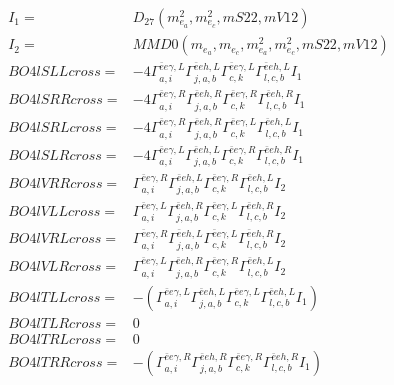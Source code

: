 \documentclass[A4,landscape]{article}
\begin{document}
\begin{align} 
I_1 = & D_{27}(m^2_{e_{{a}}}, m^2_{e_{{c}}}, mS22, mV12) \\ 
I_2 = & MMD0(m_{e_{{a}}}, m_{e_{{c}}}, m^2_{e_{{a}}}, m^2_{e_{{c}}}, mS22, mV12) \\ 
  BO4lSLLcross= & -4  \Gamma^{\bar{e}e \gamma ,L}_{a, i} \Gamma^{\bar{e}e h ,L}_{j, a, b} \Gamma^{\bar{e}e \gamma ,L}_{c, k} \Gamma^{\bar{e}e h ,L}_{l, c, b} I_1 \\ 
  BO4lSRRcross= & -4  \Gamma^{\bar{e}e \gamma ,R}_{a, i} \Gamma^{\bar{e}e h ,R}_{j, a, b} \Gamma^{\bar{e}e \gamma ,R}_{c, k} \Gamma^{\bar{e}e h ,R}_{l, c, b} I_1 \\ 
  BO4lSRLcross= & -4  \Gamma^{\bar{e}e \gamma ,R}_{a, i} \Gamma^{\bar{e}e h ,R}_{j, a, b} \Gamma^{\bar{e}e \gamma ,L}_{c, k} \Gamma^{\bar{e}e h ,L}_{l, c, b} I_1 \\ 
  BO4lSLRcross= & -4  \Gamma^{\bar{e}e \gamma ,L}_{a, i} \Gamma^{\bar{e}e h ,L}_{j, a, b} \Gamma^{\bar{e}e \gamma ,R}_{c, k} \Gamma^{\bar{e}e h ,R}_{l, c, b} I_1 \\ 
  BO4lVRRcross= &  \Gamma^{\bar{e}e \gamma ,R}_{a, i} \Gamma^{\bar{e}e h ,L}_{j, a, b} \Gamma^{\bar{e}e \gamma ,R}_{c, k} \Gamma^{\bar{e}e h ,L}_{l, c, b} I_2 \\ 
  BO4lVLLcross= &  \Gamma^{\bar{e}e \gamma ,L}_{a, i} \Gamma^{\bar{e}e h ,R}_{j, a, b} \Gamma^{\bar{e}e \gamma ,L}_{c, k} \Gamma^{\bar{e}e h ,R}_{l, c, b} I_2 \\ 
  BO4lVRLcross= &  \Gamma^{\bar{e}e \gamma ,R}_{a, i} \Gamma^{\bar{e}e h ,L}_{j, a, b} \Gamma^{\bar{e}e \gamma ,L}_{c, k} \Gamma^{\bar{e}e h ,R}_{l, c, b} I_2 \\ 
  BO4lVLRcross= &  \Gamma^{\bar{e}e \gamma ,L}_{a, i} \Gamma^{\bar{e}e h ,R}_{j, a, b} \Gamma^{\bar{e}e \gamma ,R}_{c, k} \Gamma^{\bar{e}e h ,L}_{l, c, b} I_2 \\ 
  BO4lTLLcross= & -( \Gamma^{\bar{e}e \gamma ,L}_{a, i} \Gamma^{\bar{e}e h ,L}_{j, a, b} \Gamma^{\bar{e}e \gamma ,L}_{c, k} \Gamma^{\bar{e}e h ,L}_{l, c, b} I_1) \\ 
  BO4lTLRcross= & 0 \\ 
  BO4lTRLcross= & 0 \\ 
  BO4lTRRcross= & -( \Gamma^{\bar{e}e \gamma ,R}_{a, i} \Gamma^{\bar{e}e h ,R}_{j, a, b} \Gamma^{\bar{e}e \gamma ,R}_{c, k} \Gamma^{\bar{e}e h ,R}_{l, c, b} I_1) \\ 
\end{align} 
\end{document}
